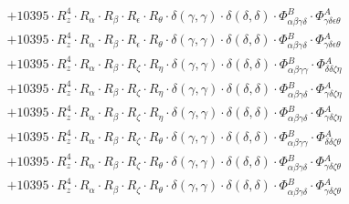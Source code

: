 \documentclass{article}
\begin{document}
\begin{subequations}
\begin{gather}
\begin{array}{c}
 \\[0.2em] 		 + 10395 \cdot R_{z}^{4} \cdot R_{\alpha{}} \cdot R_{\beta{}} \cdot R_{\epsilon{}} \cdot R_{\theta{}} \cdot \delta{}\left(\gamma{}, \gamma{}\right) \cdot \delta{}\left(\delta{}, \delta{}\right) \cdot \Phi{}^{B}_{\alpha{}\beta{}\gamma{}\delta{}} \cdot \Phi{}^{A}_{\gamma{}\delta{}\epsilon{}\theta{}} 
 \\[0.2em] 		 + 10395 \cdot R_{z}^{4} \cdot R_{\alpha{}} \cdot R_{\beta{}} \cdot R_{\epsilon{}} \cdot R_{\theta{}} \cdot \delta{}\left(\gamma{}, \gamma{}\right) \cdot \delta{}\left(\delta{}, \delta{}\right) \cdot \Phi{}^{B}_{\alpha{}\beta{}\gamma{}\delta{}} \cdot \Phi{}^{A}_{\gamma{}\delta{}\epsilon{}\theta{}} 
 \\[0.2em] 		 + 10395 \cdot R_{z}^{4} \cdot R_{\alpha{}} \cdot R_{\beta{}} \cdot R_{\zeta{}} \cdot R_{\eta{}} \cdot \delta{}\left(\gamma{}, \gamma{}\right) \cdot \delta{}\left(\delta{}, \delta{}\right) \cdot \Phi{}^{B}_{\alpha{}\beta{}\gamma{}\gamma{}} \cdot \Phi{}^{A}_{\delta{}\delta{}\zeta{}\eta{}} 
 \\[0.2em] 		 + 10395 \cdot R_{z}^{4} \cdot R_{\alpha{}} \cdot R_{\beta{}} \cdot R_{\zeta{}} \cdot R_{\eta{}} \cdot \delta{}\left(\gamma{}, \gamma{}\right) \cdot \delta{}\left(\delta{}, \delta{}\right) \cdot \Phi{}^{B}_{\alpha{}\beta{}\gamma{}\delta{}} \cdot \Phi{}^{A}_{\gamma{}\delta{}\zeta{}\eta{}} 
 \\[0.2em] 		 + 10395 \cdot R_{z}^{4} \cdot R_{\alpha{}} \cdot R_{\beta{}} \cdot R_{\zeta{}} \cdot R_{\eta{}} \cdot \delta{}\left(\gamma{}, \gamma{}\right) \cdot \delta{}\left(\delta{}, \delta{}\right) \cdot \Phi{}^{B}_{\alpha{}\beta{}\gamma{}\delta{}} \cdot \Phi{}^{A}_{\gamma{}\delta{}\zeta{}\eta{}} 
 \\[0.2em] 		 + 10395 \cdot R_{z}^{4} \cdot R_{\alpha{}} \cdot R_{\beta{}} \cdot R_{\zeta{}} \cdot R_{\theta{}} \cdot \delta{}\left(\gamma{}, \gamma{}\right) \cdot \delta{}\left(\delta{}, \delta{}\right) \cdot \Phi{}^{B}_{\alpha{}\beta{}\gamma{}\gamma{}} \cdot \Phi{}^{A}_{\delta{}\delta{}\zeta{}\theta{}} 
 \\[0.2em] 		 + 10395 \cdot R_{z}^{4} \cdot R_{\alpha{}} \cdot R_{\beta{}} \cdot R_{\zeta{}} \cdot R_{\theta{}} \cdot \delta{}\left(\gamma{}, \gamma{}\right) \cdot \delta{}\left(\delta{}, \delta{}\right) \cdot \Phi{}^{B}_{\alpha{}\beta{}\gamma{}\delta{}} \cdot \Phi{}^{A}_{\gamma{}\delta{}\zeta{}\theta{}} 
 \\[0.2em] 		 + 10395 \cdot R_{z}^{4} \cdot R_{\alpha{}} \cdot R_{\beta{}} \cdot R_{\zeta{}} \cdot R_{\theta{}} \cdot \delta{}\left(\gamma{}, \gamma{}\right) \cdot \delta{}\left(\delta{}, \delta{}\right) \cdot \Phi{}^{B}_{\alpha{}\beta{}\gamma{}\delta{}} \cdot \Phi{}^{A}_{\gamma{}\delta{}\zeta{}\theta{}} 

\end{array}
\end{gather}
\end{subequations}
\end{document}
